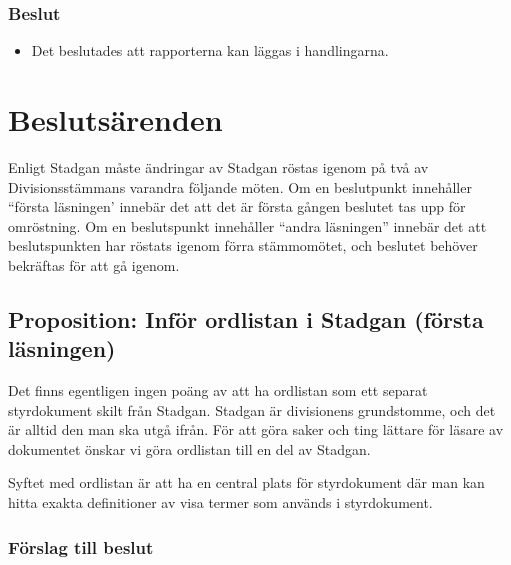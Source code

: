 \documentclass[protokoll]{dvd}
\begin{document}
\subsubsection{Beslut}
\begin{itemize}
	\item Det beslutades att rapporterna kan läggas i handlingarna. 
\end{itemize}

\newpage
\section{Beslutsärenden}

Enligt Stadgan måste ändringar av Stadgan röstas igenom på två av Divisionsstämmans varandra följande möten.
Om en beslutpunkt innehåller ``första läsningen' innebär det att det är första gången beslutet tas upp för omröstning.
Om en beslutspunkt innehåller ``andra läsningen'' innebär det att beslutspunkten har röstats igenom förra stämmomötet, och beslutet behöver bekräftas för att gå igenom. 

\subsection{Proposition: Inför ordlistan i Stadgan (första läsningen)}

Det finns egentligen ingen poäng av att ha ordlistan som ett separat styrdokument skilt från Stadgan.
Stadgan är divisionens grundstomme, och det är alltid den man ska utgå ifrån.
För att göra saker och ting lättare för läsare av dokumentet önskar vi göra ordlistan till en del av Stadgan.

Syftet med ordlistan är att ha en central plats för styrdokument där man kan hitta exakta definitioner av visa termer som används i styrdokument.

\subsubsection*{Förslag till beslut}
\end{document}

